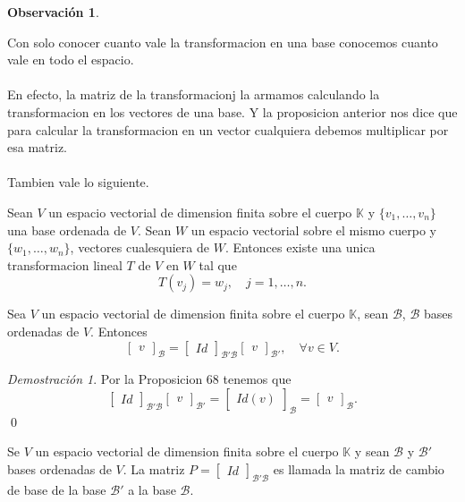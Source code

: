 \documentclass{article}
\theoremstyle{definition}
\theoremstyle{definition}
\newtheorem*{obs}{Observación}
\theoremstyle{remark}
\newtheorem*{demo}{Demostración}
\begin{document}
\begin{obs}
\end{obs}
Con solo conocer cuanto vale la transformacion en una base conocemos cuanto vale en todo el espacio.\\\\ En efecto, la matriz de la transformacionj la armamos calculando la transformacion en los vectores de una base. Y la proposicion anterior nos dice que para calcular la transformacion en un vector cualquiera debemos multiplicar por esa matriz. \\\\ 
Tambien vale lo siguiente. 
\begin{teo}
  Sean $V$ un espacio vectorial de dimension finita sobre el cuerpo $\mathbb{K}$ y $\{v_1, \dots ,v_n\}$ una base ordenada de $V$. Sean $W$ un espacio vectorial sobre el mismo cuerpo y $\{w_1, \dots ,w_n\}$, vectores cualesquiera de $W$. Entonces existe una unica transformacion lineal $T$ de $V$ en $W$ tal que \[
T(v_j)=w_j, \quad j=1, \dots ,n.
  \]
\end{teo}
\begin{corol}[Prop. 68.]
  Sea $V$ un espacio vectorial de dimension finita sobre el cuerpo $\mathbb{K}$, sean $\mathcal{B}$, $\mathcal{B
  }$ bases ordenadas de $V$. Entonces \[
    \begin{bmatrix}
v
\end{bmatrix}_{\mathcal{B}}=\begin{bmatrix}Id\end{bmatrix}_{\mathcal{B}'\mathcal{B}}\begin{bmatrix}v\end{bmatrix}_{\mathcal{B}'}, \quad \forall v \in V.
  \]
\end{corol}
\begin{demo}
  Por la Proposicion 68 tenemos que \[
    \begin{bmatrix}Id\end{bmatrix}_{\mathcal{B}'\mathcal{B}}\begin{bmatrix}v \end{bmatrix}_{\mathcal{B'}}=\begin{bmatrix}Id(v)\end{bmatrix}_{\mathcal{B}}=\begin{bmatrix}v\end{bmatrix}_{\mathcal{B}}.
  \]
  \qed
\end{demo}
\begin{defi}
  Se $V$ un espacio vectorial de dimension finita sobre el cuerpo $\mathbb{K}$ y sean $\mathcal{B}$ y $\mathcal{B}'$ bases ordenadas de $V$. La matriz $P=\begin{bmatrix}Id\end{bmatrix}_{\mathcal{B'}\mathcal{B}}$ es llamada la matriz de cambio de base de la base $\mathcal{B'}$ a la base $\mathcal{B}$.
\end{defi}\pagebreak 
\end{document}
